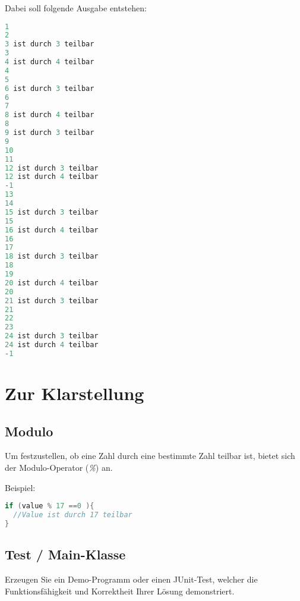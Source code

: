 \documentclass[oneside,a4paper]{scrartcl}
\begin{document}
Dabei soll folgende Ausgabe entstehen:

\begin{lstlisting}[language=java]
1
2
3 ist durch 3 teilbar
3
4 ist durch 4 teilbar
4
5
6 ist durch 3 teilbar
6
7
8 ist durch 4 teilbar
8
9 ist durch 3 teilbar
9
10
11
12 ist durch 3 teilbar
12 ist durch 4 teilbar
-1
13
14
15 ist durch 3 teilbar
15
16 ist durch 4 teilbar
16
17
18 ist durch 3 teilbar
18
19
20 ist durch 4 teilbar
20
21 ist durch 3 teilbar
21
22
23
24 ist durch 3 teilbar
24 ist durch 4 teilbar
-1
\end{lstlisting}





\section{Zur Klarstellung}

\subsection{Modulo}
Um festzustellen, ob eine Zahl durch eine bestimmte Zahl teilbar ist, bietet sich der Modulo-Operator (\emph{\%}) an.


\noindent
Beispiel:

\begin{lstlisting}[language=java]
if (value % 17 ==0 ){
  //Value ist durch 17 teilbar
}
\end{lstlisting}


\subsection{Test / Main-Klasse}
Erzeugen Sie ein Demo-Programm oder einen JUnit-Test, welcher die Funktionsfähigkeit und Korrektheit Ihrer Lösung demonstriert.
\end{document}
